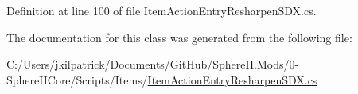 Definition at line 100 of file Item\+Action\+Entry\+Resharpen\+S\+D\+X.\+cs.



The documentation for this class was generated from the following file\+:\begin{DoxyCompactItemize}
\item 
C\+:/\+Users/jkilpatrick/\+Documents/\+Git\+Hub/\+Sphere\+I\+I.\+Mods/0-\/\+Sphere\+I\+I\+Core/\+Scripts/\+Items/\mbox{\hyperlink{_item_action_entry_resharpen_s_d_x_8cs}{Item\+Action\+Entry\+Resharpen\+S\+D\+X.\+cs}}\end{DoxyCompactItemize}

